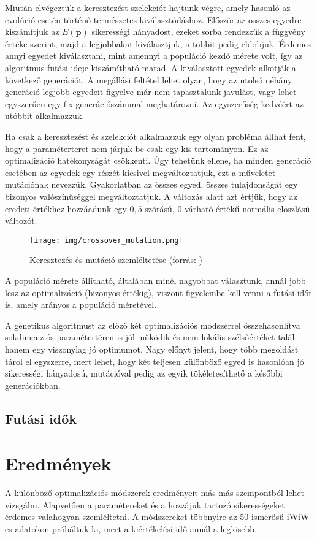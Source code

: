 \documentclass[12pt]{article}
\begin{document}
Miután elvégeztük a keresztezést szelekciót hajtunk végre, amely hasonló az evolúció esetén történő természetes kiválasztódáshoz. Először az összes egyedre kiszámítjuk az $E(\mathbf{p})$ sikerességi hányadost, ezeket sorba rendezzük a függvény értéke szerint, majd a legjobbakat kiválasztjuk, a többit pedig eldobjuk. Érdemes annyi egyedet kiválasztani, mint amennyi a populáció kezdő mérete volt, így az algoritmus futási ideje kiszámítható marad. A kiválasztott egyedek alkotják a következő generációt. A megállási feltétel lehet olyan, hogy az utolsó néhány generáció legjobb egyedeit figyelve már nem tapasztalunk javulást, vagy lehet egyszerűen egy fix generációszámmal meghatározni. Az egyszerűség kedvéért az utóbbit alkalmazzuk.

Ha csak a keresztezést és szelekciót alkalmazzuk egy olyan probléma állhat fent, hogy a paraméterteret nem járjuk be csak egy kis tartományon. Ez az optimalizáció hatékonyságát csökkenti. Úgy tehetünk ellene, ha minden generáció esetében az egyedek egy részét kicsivel megváltoztatjuk, ezt a műveletet mutációnak nevezzük. Gyakorlatban az összes egyed, összes tulajdonságát egy bizonyos valószínűséggel megváltoztatjuk. A változás alatt azt értjük, hogy az eredeti értékhez hozzáadunk egy $0,5$ szórású, $0$ várható értékű normális eloszlású változót. %

\begin{figure}[H]
	\centering
	\texttt{[image: img/crossover\_mutation.png]}
	\caption{Keresztezés és mutáció szemléltetése (forrás: \cite{genetic_cross-mutation})}
	\label{}
\end{figure}

A populáció mérete állítható, általában minél nagyobbat választunk, annál jobb lesz az optimalizáció (bizonyos értékig), viszont figyelembe kell venni a futási időt is, amely arányos a populáció méretével.

A genetikus algoritmust az előző két optimalizációs módszerrel összehasonlítva sokdimenziós paramétertéren is jól működik és nem lokális szélsőértéket talál, hanem egy viszonylag jó optimumot. Nagy előnyt jelent, hogy több megoldást tárol el egyszerre, mert lehet, hogy két teljesen különböző egyed is hasonlóan jó sikerességi hányadosú, mutációval pedig az egyik tökéletesíthető a későbbi generációkban.
\subsection{Futási idők}


\section{Eredmények}
A különböző optimalizációs módszerek eredményeit más-más szempontból lehet vizsgálni. Alapvetően a paramétereket és a hozzájuk tartozó sikerességeket érdemes valahogyan szemléltetni. A módszereket többnyire az 50 ismerősű iWiW-es adatokon próbáltuk ki, mert a kiértékelési idő annál a legkisebb.
\end{document}
